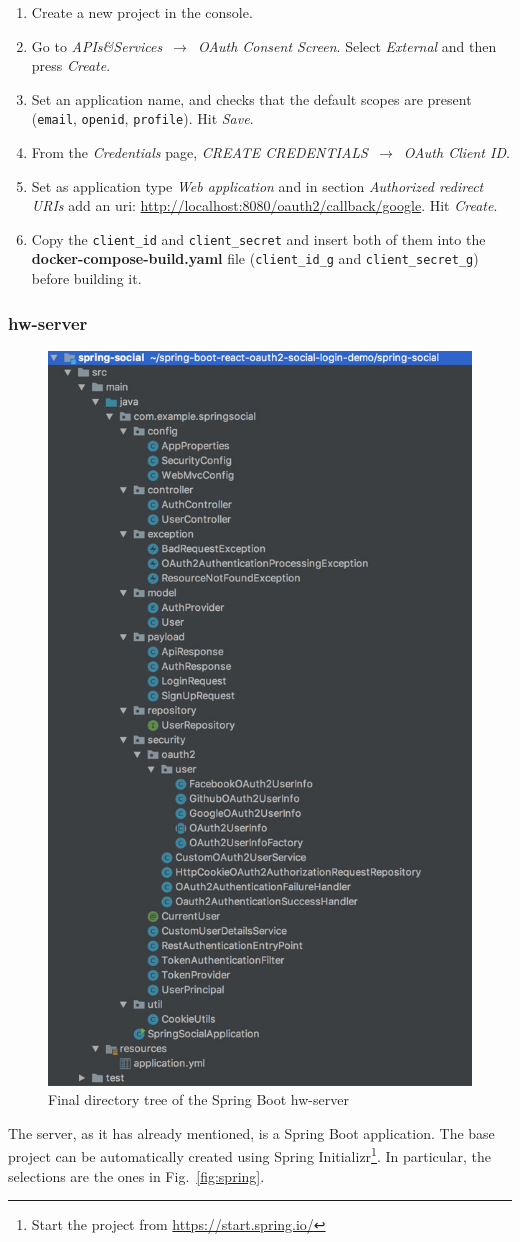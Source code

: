 \documentclass[a4paper,12pt]{article}
\def\myfig#1{Fig.~#1\xspace}
\begin{document}
\begin{enumerate}
    \item Create a new project in the console.
    \item Go to \textit{APIs\&Services} $\,\to\,$ \textit{OAuth Consent Screen}. Select \textit{External} and then press \textit{Create}.
    \item Set an application name, and checks that the default scopes are present (\texttt{email}, \texttt{openid}, \texttt{profile}). Hit \textit{Save}.
    \item From the \textit{Credentials} page, \textit{CREATE CREDENTIALS} $\,\to\,$ \textit{OAuth Client ID}.
    \item Set as application type \textit{Web application} and in section \textit{Authorized redirect URIs} add an uri: \url{http://localhost:8080/oauth2/callback/google}. Hit \textit{Create}.
    \item Copy the \texttt{client\_id} and \texttt{client\_secret} and insert both of them into the \textbf{docker-compose-build.yaml} file (\texttt{client\_id\_g} and \texttt{client\_secret\_g}) before building it.
\end{enumerate}

\subsubsection{hw-server}

\begin{figure}[ht]
    \centering
    \includegraphics[width=0.3 \textwidth]{figures/springdir.jpg}
    \caption{Final directory tree of the Spring Boot hw-server}
    \label{fig:dirsocial}
\end{figure}

The server, as it has already mentioned, is a Spring Boot application. The base project can be automatically created using Spring Initializr\footnote{Start the project from \url{https://start.spring.io/}}. In particular, the selections are the ones in \myfig{\ref{fig:spring}}.
\end{document}
